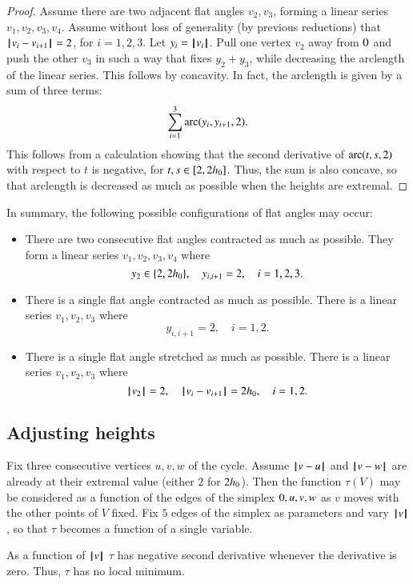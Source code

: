 {\begin{proof}
Assume there are two adjacent flat angles $v_2,v_3$, forming a linear series $v_1,v_2,v_3,v_4$.
Assume without loss of generality (by previous reductions) that
${\hskip0.1em|\hskip-0.15em|\hskip0.1em}v_i - v_{i+1}{\hskip0.1em|\hskip-0.15em|\hskip0.1em}=2$, for $i=1,2,3$.
Let $y_i = {{\hskip0.1em|\hskip-0.15em|\hskip0.1em}v_i{\hskip0.1em|\hskip-0.15em|\hskip0.1em}}$.
Pull one vertex $v_2$ away from $0$ and push the other $v_3$ in such a way that fixes $y_2+y_3$, while decreasing the arclength of the linear series.  This follows by concavity.
In fact, the arclength is given by a sum of three terms:
  $$
  \sum_{i=1}^3\operatorname{arc}(y_i,y_{i+1},2).
  $$
This follows from a calculation showing that the second derivative of $\operatorname{arc}(t,s,2)$ with respect to $t$ is negative, for $t,s\in[2,2{h_0}]$.  Thus, the
sum is also concave, so that arclength is decreased as much as possible when the heights are extremal.
\end{proof}

In summary,  the following possible configurations of flat angles may occur:
\begin{itemize}
\item There are two consecutive flat angles contracted as much as possible.  They form a linear series $v_1,v_2,v_3,v_4$ where
$$
y_2\in\{2,2{h_0}\},\quad
y_{i,i+1}=2,\quad i=1,2,3.
$$
\item There is a single flat angle contracted as much as possible.  There
is a linear series $v_1,v_2,v_3$ where
$$
y_{i,i+1}=2,\quad i=1,2.
$$
\item There is a single flat angle stretched as much as possible.  There
is a linear series $v_1,v_2,v_3$ where
$$
{{\hskip0.1em|\hskip-0.15em|\hskip0.1em}v_2{\hskip0.1em|\hskip-0.15em|\hskip0.1em}}=2,\quad
{\hskip0.1em|\hskip-0.15em|\hskip0.1em}v_i - v_{i+1}{\hskip0.1em|\hskip-0.15em|\hskip0.1em}=2{h_0},\quad i=1,2.
$$
\end{itemize}


\subsection{Adjusting heights}

Fix three consecutive vertices $u,v,w$ of the cycle.
Assume ${\hskip0.1em|\hskip-0.15em|\hskip0.1em}v - u{\hskip0.1em|\hskip-0.15em|\hskip0.1em}$ and ${\hskip0.1em|\hskip-0.15em|\hskip0.1em}v - w{\hskip0.1em|\hskip-0.15em|\hskip0.1em}$ are already at their extremal value (either $2$ for  $2{h_0}$).  Then the function $\tau(V)$ may be considered as a function
of the edges of the simplex $0,u,v,w$ as $v$ moves with the other points of $V$ fixed.  Fix $5$ edges of the simplex as parameters and vary ${{\hskip0.1em|\hskip-0.15em|\hskip0.1em}v{\hskip0.1em|\hskip-0.15em|\hskip0.1em}}$, so that $\tau$ becomes a function of a single variable.

\begin{lemma} As a function of ${{\hskip0.1em|\hskip-0.15em|\hskip0.1em}v{\hskip0.1em|\hskip-0.15em|\hskip0.1em}}$
 $\tau$ has negative second derivative whenever the derivative is zero.  Thus, $\tau$ has no local minimum.
\end{lemma}

}
